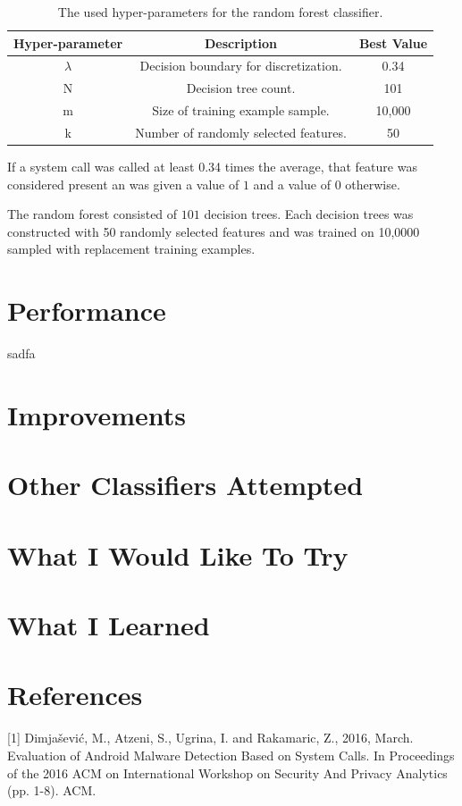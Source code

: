 \documentclass[a4paper, 11pt]{article} %
\begin{document}
\begin{table}[H]
{\renewcommand{\arraystretch}{1.2}%
\begin{tabular}{| c | c | c |}
\hline
Hyper-parameter & Description & Best Value\\
\hline
$\lambda$ & Decision boundary for discretization. & 0.34\\ \hline
N & Decision tree count. & 101\\ \hline
m & Size of training example sample. & 10,000\\ \hline
k & Number of randomly selected features. & 50\\ \hline
\end{tabular}}
\caption{The used hyper-parameters for the random forest classifier.}
\end{table}

If a system call was called at least 0.34 times the average, that feature was considered present an was given a value of $1$ and a value of $0$ otherwise. 

The random forest consisted of $101$ decision trees. Each decision trees was constructed with 50 randomly selected features and was trained on 10,0000 sampled with replacement training examples.

\section*{Performance}
sadfa

\section*{Improvements}

\section*{Other Classifiers Attempted}

\section*{What I Would Like To Try}

\section*{What I Learned}

\section*{References}
[1] Dimja\v{s}evi\'{c}, M., Atzeni, S., Ugrina, I. and Rakamaric, Z., 2016, March. Evaluation of Android Malware Detection Based on System Calls. In Proceedings of the 2016 ACM on International Workshop on Security And Privacy Analytics (pp. 1-8). ACM.
\end{document}
